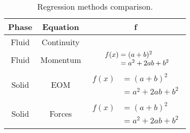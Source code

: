 \begin{table}[htbp]
  \centering

\centering 
\renewcommand{\arraystretch}{1.3}
\begin{tabular}{|c| c| c|}
	\hline %
	Phase & Equation & f \\[0.5ex] 
	\hline 
	Fluid & Continuity &  	\\
	\hline 
	Fluid & Momentum & $\begin{array} {r@{}l@{}} f(x) & {}= (a+b)^2 \\ & {}=
	a^2+2ab+b^2 \end{array}$ \\    
	\hline 
	Solid & EOM & $\begin{aligned} f(x) & = (a+b)^2 \\ & = a^2+2ab+b^2
	\end{aligned}$
	\\
	\hline
	Solid & Forces & $\begin{aligned} f(x) & = (a+b)^2 \\ & = a^2+2ab+b^2
	\end{aligned}$
	\\
	\hline
\end{tabular}
      \caption{Regression methods comparison.}
  \label{tab:18unresolvedcfd}%
\end{table}%